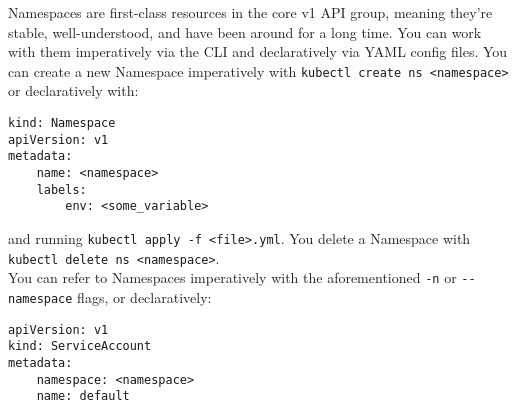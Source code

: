 \documentclass[8pt, table, xcdraw]{article}%
\begin{document}
Namespaces are first-class resources in the core v1 API group, meaning they’re stable, well-understood, and have been around for a long time. You can work with them imperatively via the CLI and declaratively via YAML config files. You can create a new Namespace imperatively with \lstinline{kubectl create ns <namespace>} or declaratively with:

\begin{lstlisting}
kind: Namespace
apiVersion: v1
metadata:
    name: <namespace>
    labels:
        env: <some_variable>
\end{lstlisting}

and running \lstinline{kubectl apply -f <file>.yml}. You delete a Namespace with \lstinline{kubectl delete ns <namespace>}.\\
You can refer to Namespaces imperatively with the aforementioned \lstinline{-n} or \lstinline{--namespace} flags, or declaratively:

\begin{lstlisting}
apiVersion: v1
kind: ServiceAccount
metadata:
    namespace: <namespace>
    name: default
\end{lstlisting}
\end{document}
